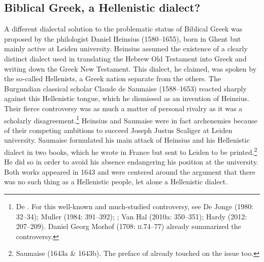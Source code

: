 \documentclass[output=paper]{langsci/langscibook}
\begin{document}
\subsection{Biblical Greek, a Hellenistic dialect?}
\hypertarget{Toc19704832}{}
A different dialectal solution to the problematic status of Biblical Greek was proposed by the philologist Daniel Heinsius (1580–1655), born in Ghent but mainly active at Leiden university. Heinsius assumed the existence of a clearly distinct dialect used in translating the Hebrew Old Testament into Greek and writing down the Greek New Testament. This dialect, he claimed, was spoken by the so-called Hellenists, a Greek nation separate from the others. The Burgundian classical scholar Claude de Saumaise (1588–1653) reacted sharply against this Hellenistic tongue, which he dismissed as an invention of Heinsius. Their fierce controversy was as much a matter of personal rivalry as it was a scholarly disagreement.\footnote{De \citet[32]{Jonge1980}. For this well-known and much-studied controversy, see De Jonge (1980: 32–34); Muller (1984: 391–392); \citet{Considine2010}; Van Hal (2010a: 350–351); Hardy (2012: 207–209). Daniel Georg Morhof (1708: \textsc{ii.}74–77) already summarized the controversy.} Heinsius and Saumaise were in fact archenemies because of their competing ambitions to succeed Joseph Justus Scaliger at Leiden university. Saumaise formulated his main attack of Heinsius and his Hellenistic dialect in two books, which he wrote in France but sent to Leiden to be printed.\footnote{Saumaise (1643a \& 1643b). The preface of \citet{Saumaise1639} already touched on the issue too.} He did so in order to avoid his absence endangering his position at the university. Both works appeared in 1643 and were centered around the argument that there was no such thing as a Hellenistic people, let alone a Hellenistic dialect.
\end{document}
